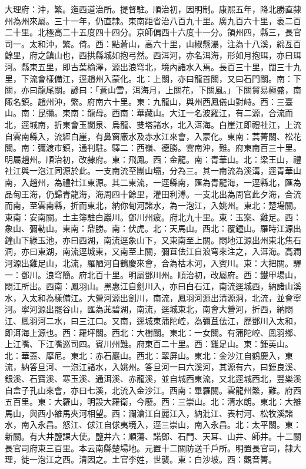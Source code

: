 \begin{pinyinscope}
大理府：沖，繁。迤西道治所。提督駐。順治初，因明制。康熙五年，降北勝直隸州為州來屬。三十一年，仍直隸。東南距省治八百九十里。廣九百六十里，袤二百二十里。北極高二十五度四十四分。京師偏西十六度十一分。領州四，縣三，長官司一。太和沖，繁。倚。西：點蒼山，高六十里，山椒懸瀑，注為十八溪，綿亙百餘里，府之鎮山也，西拱縣城如抱弓然。西洱河，亦名洱海，形如月抱珥，亦曰珥河。縣東五里，即古葉榆澤，源出浪穹北，境內諸水入焉。長百三十里，闊三十九里，下流會樣備江，逕趙州入蒙化。北：上關，亦曰龍首關，又曰石門關。南：下關，亦曰龍尾關。諺曰：「蒼山雪，洱海月，上關花，下關風。」下關貿易極盛，南陬名鎮。趙州沖，繁。府南六十里。東：九龍山，與州西鳳儀山對峙。西：三臺山。南：昆彌。東南：龍母。西南：華藏山。大江一名波羅江，有二源，合流而北，逕城南，折東會玉閬泉、烏龍、雙塔諸水，北入洱海。白崖江即禮社江，上流自雲南縣入，流經白崖，有鼻窗廠水及赤水江來會，入蒙化。東南：蒿菁關、松花關。南：彌渡市鎮，通判駐。驛二：西嶺、德勝。雲南沖，難。府東南百三十里。明屬趙州。順治初，改隸府。東：飛鳳。西：金龍。南：青華山。北：梁王山，禮社江與一泡江同源於此。一支南流至團山壩，分為三。其一南流為溪溝，逕青華山南，入趙州，為禮社江東源。其二東流，一逕縣南，匯為青龍海，一逕縣北，匯為品甸王海，仍歸青龍海，海周四十餘里，灌田利溥。一支北出為周官此夕海，合流而南，至雲南縣，折而東北，納你甸河諸水，為一泡江，入姚州。東北：楚場關。東南：安南關。土主簿駐白巖川。鄧川州疲。府北九十里。東：玉案、雞足。西：象山、彌勒山。東南：鼎勝。南：伏虎。北：天馬山。西北：覆鐘山。羅時江源出鐘山下綠玉池，亦曰西湖，南流逕象山下，又東南至上關。悶地江源出州東北焦石洞，亦曰東湖，南流逕城東，又南至上關，彌苴佉江自浪穹來注之，入洱海。高澗河源出雞足山，北流，羅陋河自鶴慶來會，合為枯木河，入賓川。東：大把關。驛一：鄧川。浪穹簡。府北百十里。明屬鄧川州。順治初，改屬府。西：鐵甲場山，悶江所出。西南：鳳羽山。黑惠江自劍川入，亦曰白石江，南流逕城西，納諸山溪水，入太和為樣備江。大營河源出劍川，南流，鳳羽河源出清源洞，北流，並會寧河。寧河源出罷谷山，匯為茈碧湖，南流，逕城東北，南會大營河，折西，納悶江、鳳羽河二水，曰三江口。又南，逕城東蒲陀崆，為彌苴佉江，歷鄧川入太和，即洱海上源也。西：羅坪關。西北：大樹關。東北：一女關。有蒲陀崆、鳳羽鄉、上江嘴、下江嘴巡司四。賓川州難。府東百二十里。西：雞足山。東：鍾英山。北：華蓋、摩尼。東北：赤石巖山。西北：翠屏山。東北：金沙江自鶴慶入，東流，納答旦河、一泡江諸水，入姚州。答旦河一曰六溪河，其源有六，曰鍾良溪、銀溪、石寶溪、寒玉溪、通洱溪、赤龍溪，並自城西東流，又北逕城西北，豐樂溪自盒子孔山來會，亦曰七溪，北流入金沙江。西南：畢羅關。雲龍州繁，難。府西五百里。東：大羅山，明設大羅衛，今廢。西：三崇山。北：清水朗。東北：大雒馬山，與西小雒馬夾河相望。西：瀾滄江自麗江入，納沘江、表村河、松牧溪諸水，南入永昌。怒江、俅江自俅夷境入，逕三崇山，南入永昌。北：太平關。東：新關。有大井鹽課大使。鹽井六：順蕩、諾鄧、石門、天耳、山井、師井。十二關長官司府東三百里。本云南縣楚場地。元置十二關防送千戶所。明置長官司，隸大理，徙一泡江之西。清因之。土官李姓，世襲。東：白沙坡。西：觀音箐。


\end{pinyinscope}
